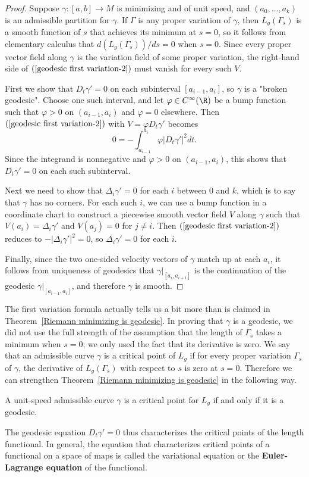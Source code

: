 \begin{proof}
Suppose $\gamma:[a,b]\to M$ is minimizing and of unit speed, and $(a_0,\dots,a_k)$ is an admissible partition for $\gamma$. If $\Gamma$ is any proper variation of $\gamma$, 
then $L_g(\Gamma_s)$ is a smooth function of $s$ that achieves its minimum at $s=0$, so it follows from elementary calculus that $d(L_g(\Gamma_s))/ds=0$ when $s=0$. Since 
every proper vector field along $\gamma$ is the variation field of some proper variation, the right-hand side of $(\ref{geodesic first variation-2})$ must vanish for 
every such $V$.\par
First we show that $D_t\gamma'=0$ on each subinterval $[a_{i-1},a_i]$, so $\gamma$ is a "broken geodesic". Choose one such interval, and let $\varphi\in C^{\infty}(\R)$ be 
a bump function such that $\varphi>0$ on $(a_{i-1},a_i)$ and $\varphi=0$ elsewhere. Then $(\ref{geodesic first variation-2})$ with $V=\varphi D_t\gamma'$ becomes
\[0=-\int_{a_{i-1}}^{a_i}\varphi|D_t\gamma'|^2dt.\]
Since the integrand is nonnegative and $\varphi>0$ on $(a_{i-1},a_i)$, this shows that $D_t\gamma'=0$ on each such subinterval.\par
Next we need to show that $\Delta_i\gamma'=0$ for each $i$ between $0$ and $k$, which is to say that $\gamma$ has no corners. For each such $i$, we can use a bump 
function in a coordinate chart to construct a piecewise smooth vector field $V$ along $\gamma$ such that $V(a_i)=\Delta_i\gamma'$ and $V(a_{j})=0$ for $j\neq i$. Then 
$(\ref{geodesic first variation-2})$ reduces to $-|\Delta_i\gamma'|^2=0$, so $\Delta_i\gamma'=0$ for each $i$.\par
Finally, since the two one-sided velocity vectors of $\gamma$ match up at each $a_i$, it follows from uniqueness of geodesics that $\gamma|_{[a_{i},a_{i+1}]}$ is the 
continuation of the geodesic $\gamma|_{[a_{i-1},a_i]}$, and therefore $\gamma$ is smooth.
\end{proof}
The first variation formula actually tells us a bit more than is claimed in Theorem~\ref{Riemann minimizing is geodesic}. In proving that $\gamma$ is a geodesic, we did not use the full strength of 
the assumption that the length of $\Gamma_s$ takes a minimum when $s=0$; we only used the fact that its derivative is zero. We say that an admissible curve $\gamma$ is 
a critical point of $L_g$ if for every proper variation $\Gamma_s$ of $\gamma$, the derivative of $L_g(\Gamma_s)$ with respect to $s$ is zero at $s=0$. Therefore we can 
strengthen Theorem~\ref{Riemann minimizing is geodesic} in the following way.
\begin{corollary}\label{Riemann critical of L_g iff geodesic}
A unit-speed admissible curve $\gamma$ is a critical point for $L_g$ if and only if it is a geodesic.
\end{corollary}
The geodesic equation $D_t\gamma'=0$ thus characterizes the critical points of the length functional. In general, the equation that characterizes critical points of a 
functional on a space of maps is called the variational equation or the \textbf{Euler-Lagrange equation} of the functional.
